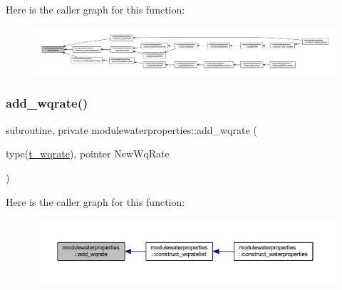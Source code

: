 Here is the caller graph for this function\+:\nopagebreak
\begin{figure}[H]
\begin{center}
\leavevmode
\includegraphics[width=350pt]{namespacemodulewaterproperties_ac86532460470d9c3746a9645ede24903_icgraph}
\end{center}
\end{figure}
\mbox{\label{namespacemodulewaterproperties_ab70fa49456211c5f7697e02f7d5e81d2}} 
\subsubsection{\texorpdfstring{add\+\_\+wqrate()}{add\_wqrate()}}
{\footnotesize\ttfamily subroutine, private modulewaterproperties\+::add\+\_\+wqrate (\begin{DoxyParamCaption}\item[{type(\mbox{\hyperlink{structmodulewaterproperties_1_1t__wqrate}{t\+\_\+wqrate}}), pointer}]{New\+Wq\+Rate }\end{DoxyParamCaption})\hspace{0.3cm}{\ttfamily [private]}}

Here is the caller graph for this function\+:\nopagebreak
\begin{figure}[H]
\begin{center}
\leavevmode
\includegraphics[width=350pt]{namespacemodulewaterproperties_ab70fa49456211c5f7697e02f7d5e81d2_icgraph}
\end{center}
\end{figure}
\mbox{\label{namespacemodulewaterproperties_a2a206e94af2b9f46781896fdc7ccfb3a}} 

